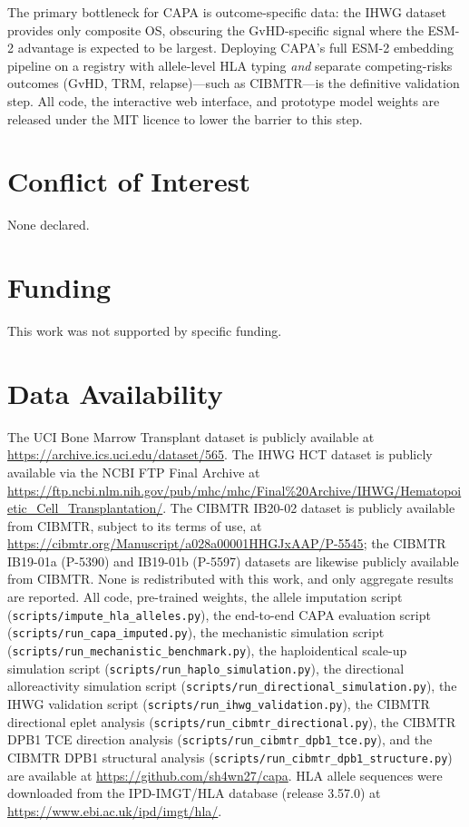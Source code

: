 \documentclass[11pt,a4paper]{article}
\begin{document}
The primary bottleneck for CAPA is outcome-specific data: the IHWG dataset
provides only composite OS, obscuring the GvHD-specific signal where the ESM-2
advantage is expected to be largest.  Deploying CAPA's full ESM-2 embedding
pipeline on a registry with allele-level HLA typing \emph{and} separate
competing-risks outcomes (GvHD, TRM, relapse)---such as CIBMTR---is the
definitive validation step.  All code, the interactive web interface, and
prototype model weights are released under the MIT licence to lower the
barrier to this step.

\section*{Conflict of Interest}
None declared.

\section*{Funding}
This work was not supported by specific funding.

\section*{Data Availability}
The UCI Bone Marrow Transplant dataset is publicly available at
\url{https://archive.ics.uci.edu/dataset/565}.  The IHWG HCT dataset is
publicly available via the NCBI FTP Final Archive at
\url{https://ftp.ncbi.nlm.nih.gov/pub/mhc/mhc/Final\%20Archive/IHWG/Hematopoietic_Cell_Transplantation/}.
The CIBMTR IB20-02 dataset is publicly available from CIBMTR, subject to its
terms of use, at \url{https://cibmtr.org/Manuscript/a028a00001HHGJxAAP/P-5545};
the CIBMTR IB19-01a (P-5390) and IB19-01b (P-5597) datasets are likewise
publicly available from CIBMTR.  None is redistributed with this work, and
only aggregate results are reported.
All code, pre-trained weights, the allele imputation script
(\texttt{scripts/impute\_hla\_alleles.py}),
the end-to-end CAPA evaluation script (\texttt{scripts/run\_capa\_imputed.py}),
the mechanistic simulation script (\texttt{scripts/run\_mechanistic\_benchmark.py}),
the haploidentical scale-up simulation script (\texttt{scripts/run\_haplo\_simulation.py}),
the directional alloreactivity simulation script (\texttt{scripts/run\_directional\_simulation.py}),
the IHWG validation script (\texttt{scripts/run\_ihwg\_validation.py}),
the CIBMTR directional eplet analysis (\texttt{scripts/run\_cibmtr\_directional.py}),
the CIBMTR DPB1 TCE direction analysis (\texttt{scripts/run\_cibmtr\_dpb1\_tce.py}),
and the CIBMTR DPB1 structural analysis (\texttt{scripts/run\_cibmtr\_dpb1\_structure.py})
are available at \url{https://github.com/sh4wn27/capa}.  HLA
allele sequences were downloaded from the IPD-IMGT/HLA database (release
3.57.0) at \url{https://www.ebi.ac.uk/ipd/imgt/hla/}.
\end{document}
